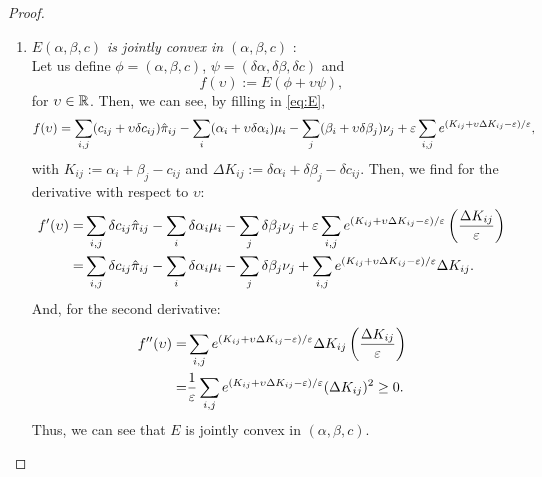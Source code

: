 \begin{proof}
	\begin{enumerate}[label=(\roman*)]
		\item \textit{$E(\alpha, \beta, c)$ is jointly convex in $(\alpha, \beta, c)$} : \\
		Let us define $\phi = (\alpha, \beta, c)$, $\psi = (\delta \alpha, \delta \beta, \delta c)$ and 
		\begin{equation*}
			f(\upsilon) := E(\phi + \upsilon \psi), 
		\end{equation*}	
		for $\upsilon \in \mathbb{R}$. Then, we can see, by filling in \eqref{eq:E},
		\begin{equation*}
			f(\upsilon) =  \sum_{i,j} (c_{ij} + \upsilon \delta c_{ij})\hat{\pi}_{ij} - \sum_i (\alpha_{i} + \upsilon \delta \alpha_{i}) \mu_i - \sum_j (\beta_{i} + \upsilon \delta \beta_{j}) \nu_j + \varepsilon \sum_{i,j} e^{(K_{ij} + \upsilon \Delta K_{ij}-\varepsilon)/\varepsilon},
		\end{equation*}
		with $K_{ij} := \alpha_i + \beta_j - c_{ij}$ and $\Delta K_{ij} := \delta \alpha_i + \delta \beta_j - \delta c_{ij}$. Then, we find for the derivative with respect to $\upsilon$:
		\begin{align*}
			f'(\upsilon) = &  \sum_{i,j} \delta c_{ij}\hat{\pi}_{ij} - \sum_i \delta \alpha_{i} \mu_i - \sum_j  \delta \beta_{j} \nu_j + \varepsilon \sum_{i,j} e^{(K_{ij} + \upsilon \Delta K_{ij}-\varepsilon)/\varepsilon} \left(\frac{\Delta K_{ij}}{\varepsilon}\right)  \\
			= &  \sum_{i,j} \delta c_{ij}\hat{\pi}_{ij} - \sum_i \delta \alpha_{i} \mu_i - \sum_j  \delta \beta_{j} \nu_j +  \sum_{i,j} e^{(K_{ij} + \upsilon \Delta K_{ij}-\varepsilon)/\varepsilon} \Delta K_{ij}.
		\end{align*}
		And, for the second derivative:
		\begin{align*}
			f''(\upsilon) = & \sum_{i,j} e^{(K_{ij} + \upsilon \Delta K_{ij}-\varepsilon)/\varepsilon} \Delta K_{ij}  \left(\frac{\Delta K_{ij}}{\varepsilon}\right) \\
			=& \frac{1}{\varepsilon} \sum_{i,j} e^{(K_{ij} + \upsilon \Delta K_{ij}-\varepsilon)/\varepsilon} (\Delta K_{ij})^2 \geq 0.
		\end{align*}
		Thus, we can see that $E$ is jointly convex in $(\alpha, \beta, c)$. 
		

\end{enumerate}
\end{proof}

